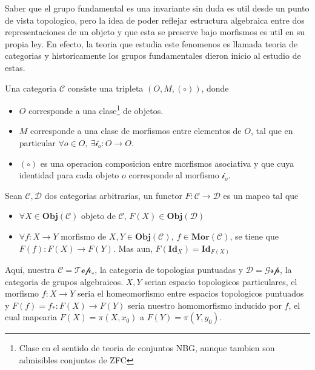 {Saber que el grupo fundamental es una invariante sin duda es util
desde un punto de vista topologico, pero la idea de poder reflejar
estructura algebraica entre dos representaciones de un objeto y que esta
se preserve bajo morfismos es util en su propia ley. En efecto, la
teoria que estudia este fenomenos es llamada teoria de categorias y
historicamente los grupos fundamentales dieron inicio al estudio de
estas.
\begin{definicion}
  Una categoria \(\mathcal C\) consiste una tripleta \((O, M,
  (\circ))\), donde
  \begin{itemize}
    \item \(O\) corresponde a una clase\footnote{Clase en el sentido de
        teoria de conjuntos NBG, aunque tambien son admisibles conjuntos
        de ZFC} de objetos.
    \item \(M\) corresponde a una clase de morfismos
      entre elementos de \(O\), tal que en particular \(\forall o \in O,\
      \exists \mathcal i _o : O \to O\).
    \item \((\circ)\) es una operacion composicion entre morfismos
      asociativa y que cuya identidad para cada objeto \(o\) corresponde al
      morfismo \(\mathcal i _o\).
  \end{itemize}
\end{definicion}
\begin{definicion}
  Sean \(\mathscr{C} , \mathscr D\) dos categorias arbitrarias, un
  functor \(F : \mathscr C \to \mathscr D\) es un mapeo tal que
  \begin{itemize}
  \item \(\forall X \in \mathbf{Obj}(\mathscr C)\) objeto de \(\mathscr
    C\), \( F(X) \in \mathbf{Obj} (\mathscr D)\)
  \item  \(\forall f : X \to Y\) morfismo de \(X,Y \in \mathbf{Obj}
    (\mathscr C),\ f \in \mathbf{Mor} (\mathscr C)\), se tiene que \(
    F(f) : F(X) \to F(Y) \). Mas aun, \(F (\mathbf{Id}_X) = \mathbf{Id}_{F(X)}\)
  \end{itemize}
\end{definicion}
Aqui, nuestra \(\mathscr C = \mathscr{Top_{*}}\), la categoria de
topologias puntuadas y \(\mathscr D = \mathscr{Grp}\), la categoria de
grupos algebraicos. \(X,Y\) serian espacio topologicos particulares, el
morfismo \(f : X \to Y\) seria el homeomorfismo entre espacios
topologicos puntuados y \(F(f) = f_{*} : F(X) \to F(Y)\) seria nuestro
homomorfismo inducido por \(f\), el cual mapearia \(F(X) = \pi (X,
x_0)\) a \(F(Y) = \pi (Y, y_0) \).
}